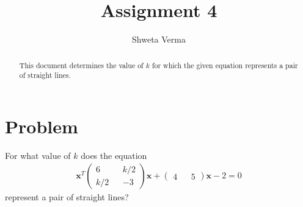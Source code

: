 \documentclass[journal,13pt,twocolumn]{IEEEtran}
\newcommand{\myvec}[1]{\ensuremath{\begin{pmatrix}#1\end{pmatrix}}}
\renewcommand{\vec}[1]{\mathbf{#1}}
\begin{document}
\title{Assignment 4} 
\author{Shweta Verma} 
\maketitle
\newpage
\bigskip
\begin{abstract}
This document determines the value of $k$ for which the given equation represents a pair of straight lines.
\end{abstract}
\section{\textbf{Problem}}
For what value of $k$ does the equation 
\begin{align}
\vec{x}^T \myvec{6 && k/2 \\ k/2 && -3} \vec{x} + \myvec{4 && 5}\vec{x} -2 = 0
\end{align}
represent a pair of straight lines?
\end{document}
